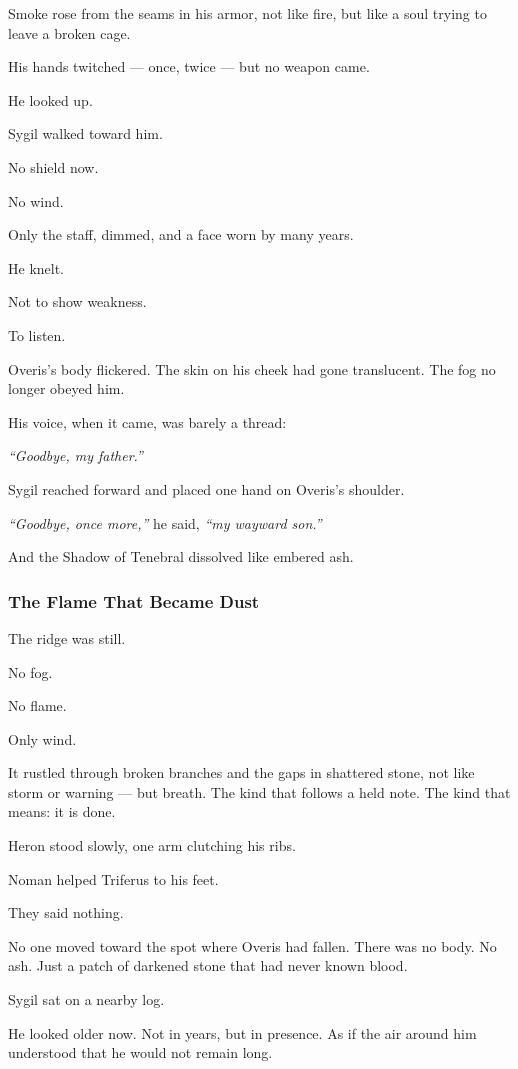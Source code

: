 \documentclass[12pt]{article}
\begin{document}
Smoke rose from the seams in his armor, not like fire, but like a soul trying to leave a broken cage.

His hands twitched — once, twice — but no weapon came.

He looked up.

Sygil walked toward him.

No shield now.

No wind.

Only the staff, dimmed, and a face worn by many years.

He knelt.

Not to show weakness.

To listen.

Overis’s body flickered. The skin on his cheek had gone translucent. The fog no longer obeyed him.

His voice, when it came, was barely a thread:

\textit{“Goodbye, my father.”}

\bigskip

Sygil reached forward and placed one hand on Overis’s shoulder.

\textit{“Goodbye, once more,”} he said, \textit{“my wayward son.”}

And the Shadow of Tenebral dissolved like embered ash.

\dotfill

\subsubsection*{The Flame That Became Dust}
The ridge was still.

No fog.

No flame.

Only wind.

It rustled through broken branches and the gaps in shattered stone, not like storm or warning — but breath. The kind that follows a held note. The kind that means: it is done.

Heron stood slowly, one arm clutching his ribs.

Noman helped Triferus to his feet.

They said nothing.

No one moved toward the spot where Overis had fallen. There was no body. No ash. Just a patch of darkened stone that had never known blood.

Sygil sat on a nearby log.

He looked older now. Not in years, but in presence. As if the air around him understood that he would not remain long.
\end{document}
